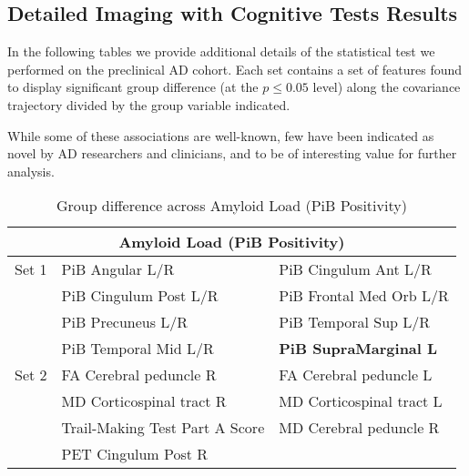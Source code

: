 \subsection*{Detailed Imaging with Cognitive Tests Results}
In the following tables we provide additional details of the statistical test we performed on the preclinical AD cohort. Each set contains a set of features found to display significant group difference (at the $p \leq 0.05$ level) along the covariance trajectory divided by the group variable indicated.

While some of these associations are well-known, few have been indicated as novel by AD researchers and clinicians, and to be of interesting value for further analysis. 

\begin{table}[!]
	\centering
	\begin{tabular}{p{0.8cm}p{5.5cm}p{6cm}}
		\toprule
		\multicolumn{3}{c}{\textbf{Amyloid Load (PiB Positivity)}}\\ \midrule \midrule
		Set 1 & PiB Angular L/R & PiB Cingulum Ant L/R \\
		& PiB Cingulum Post L/R & PiB Frontal Med Orb L/R \\
		& PiB Precuneus L/R & PiB Temporal Sup L/R \\
		& PiB Temporal Mid L/R & \textbf{PiB SupraMarginal L} \\
		\midrule
		Set 2     & FA Cerebral peduncle R   & FA Cerebral peduncle L	\\
		& MD Corticospinal tract R	& MD Corticospinal tract L		\\
			     & Trail-Making Test Part A Score  & MD Cerebral peduncle R \\ 
			    &PET Cingulum Post R  &  \\ \midrule\bottomrule
	\end{tabular}
	\caption{Group difference across Amyloid Load (PiB Positivity)}
\end{table}

